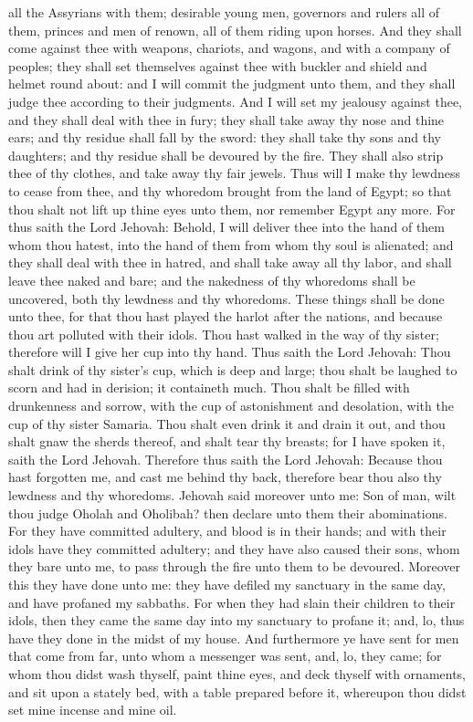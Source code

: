 all the Assyrians with them; desirable young men, governors and rulers all of them, princes and men of renown, all of them riding upon horses. And they shall come against thee with weapons, chariots, and wagons, and with a company of peoples; they shall set themselves against thee with buckler and shield and helmet round about: and I will commit the judgment unto them, and they shall judge thee according to their judgments. And I will set my jealousy against thee, and they shall deal with thee in fury; they shall take away thy nose and thine ears; and thy residue shall fall by the sword: they shall take thy sons and thy daughters; and thy residue shall be devoured by the fire. They shall also strip thee of thy clothes, and take away thy fair jewels. Thus will I make thy lewdness to cease from thee, and thy whoredom brought from the land of Egypt; so that thou shalt not lift up thine eyes unto them, nor remember Egypt any more. For thus saith the Lord Jehovah: Behold, I will deliver thee into the hand of them whom thou hatest, into the hand of them from whom thy soul is alienated; and they shall deal with thee in hatred, and shall take away all thy labor, and shall leave thee naked and bare; and the nakedness of thy whoredoms shall be uncovered, both thy lewdness and thy whoredoms.  These things shall be done unto thee, for that thou hast played the harlot after the nations, and because thou art polluted with their idols. Thou hast walked in the way of thy sister; therefore will I give her cup into thy hand. Thus saith the Lord Jehovah: Thou shalt drink of thy sister’s cup, which is deep and large; thou shalt be laughed to scorn and had in derision; it containeth much. Thou shalt be filled with drunkenness and sorrow, with the cup of astonishment and desolation, with the cup of thy sister Samaria. Thou shalt even drink it and drain it out, and thou shalt gnaw the sherds thereof, and shalt tear thy breasts; for I have spoken it, saith the Lord Jehovah. Therefore thus saith the Lord Jehovah: Because thou hast forgotten me, and cast me behind thy back, therefore bear thou also thy lewdness and thy whoredoms.  Jehovah said moreover unto me: Son of man, wilt thou judge Oholah and Oholibah? then declare unto them their abominations. For they have committed adultery, and blood is in their hands; and with their idols have they committed adultery; and they have also caused their sons, whom they bare unto me, to pass through the fire unto them to be devoured. Moreover this they have done unto me: they have defiled my sanctuary in the same day, and have profaned my sabbaths. For when they had slain their children to their idols, then they came the same day into my sanctuary to profane it; and, lo, thus have they done in the midst of my house. And furthermore ye have sent for men that come from far, unto whom a messenger was sent, and, lo, they came; for whom thou didst wash thyself, paint thine eyes, and deck thyself with ornaments, and sit upon a stately bed, with a table prepared before it, whereupon thou didst set mine incense and mine oil. 